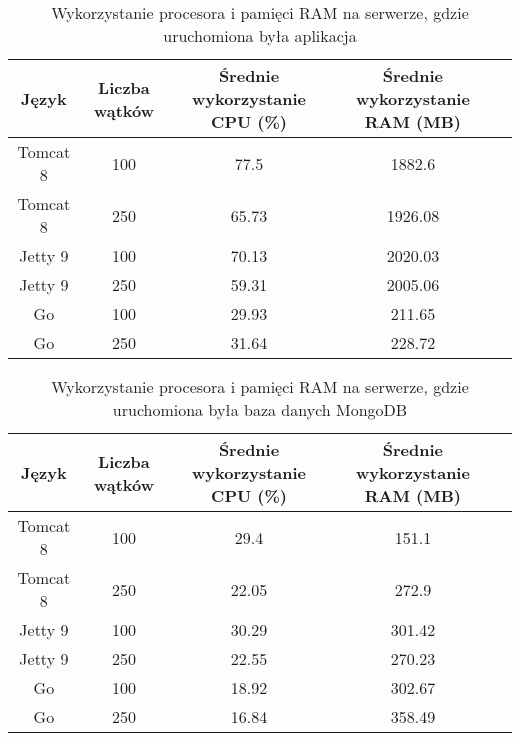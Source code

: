 
\begin{table}[!htb]
\centering
\caption{Wykorzystanie procesora i pamięci RAM na serwerze, gdzie uruchomiona była aplikacja}
\label{tab:app-clean-api}
\begin{tabular}{@{}ccccl@{}}
\toprule
\textbf{Język} & \textbf{Liczba wątków} & \multicolumn{1}{p{3cm}}{\textbf{Średnie wykorzystanie CPU (\%)}} & \multicolumn{1}{p{3cm}}{\textbf{Średnie wykorzystanie RAM (MB)}} &  \\ \midrule
Tomcat 8       & 100                    & 77.5                             & 1882.6                          &  \\
Tomcat 8       & 250                    & 65.73                             & 1926.08                          &  \\
Jetty 9       & 100                    & 70.13                             & 2020.03                          &  \\
Jetty 9       & 250                    & 59.31                             & 2005.06                          &  \\
Go       & 100                    & 29.93                             & 211.65                          &  \\
Go       & 250                    & 31.64                             & 228.72                          &  \\
\bottomrule
\end{tabular}
\end{table}


\begin{table}[!htb]
\centering
\caption{Wykorzystanie procesora i pamięci RAM na serwerze, gdzie uruchomiona była baza danych MongoDB}
\label{tab:mongo-clean-api}
\begin{tabular}{@{}ccccl@{}}
\toprule
\textbf{Język} & \textbf{Liczba wątków} & \multicolumn{1}{p{3cm}}{\textbf{Średnie wykorzystanie CPU (\%)}} & \multicolumn{1}{p{3cm}}{\textbf{Średnie wykorzystanie RAM (MB)}} &  \\ \midrule
Tomcat 8       & 100                    & 29.4                             & 151.1                          &  \\
Tomcat 8       & 250                    & 22.05                             & 272.9                          &  \\
Jetty 9       & 100                    & 30.29                             & 301.42                          &  \\
Jetty 9       & 250                    & 22.55                             & 270.23                          &  \\
Go       & 100                    & 18.92                             & 302.67                          &  \\
Go       & 250                    & 16.84                             & 358.49                          &  \\
\bottomrule
\end{tabular}
\end{table}

